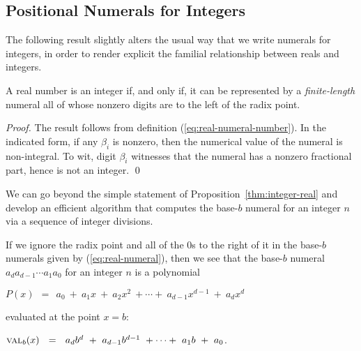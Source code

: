 \subsection{Positional Numerals for Integers}
\label{sec:special-numerals-N}


The following result slightly alters the usual way that we write numerals for integers, in order to render explicit the familial relationship between reals and integers.


\begin{prop}
\label{thm:integer-real}
A real number is an integer if, and only if, it can be represented by a {\em finite-length} numeral all of whose nonzero digits are to the left of the radix point.
\end{prop}

\begin{proof}
The result follows from definition (\ref{eq:real-numeral-number}).  In the indicated form, if any $\beta_i$ is nonzero, then the numerical value of the numeral is non-integral.  To wit, digit $\beta_i$ witnesses that the numeral has a nonzero fractional part, hence is not an integer.  \qed
\end{proof}

\medskip

We can go beyond the simple statement of Proposition~\ref{thm:integer-real} and develop an efficient algorithm that computes the base-$b$ numeral for an integer $n$ via a sequence of integer divisions.

\bigskip

If we ignore the radix point and all of the $0$s to the right of it in the base-$b$ numerals given by (\ref{eq:real-numeral}), then we see that the base-$b$ numeral $a_d a_{d-1} \cdots a_1 a_0$ for an integer $n$ is a polynomial

\smallskip

$P(x) \ \ = \ \ a_0 \ + \ a_1 x \ + \ a_2 x^2 \ + \cdots + \ a_{d-1} x^{d-1} \ + \ a_d x^d$

\smallskip

\noindent
evaluated at the point $x=b$:

\smallskip

$\mbox{\sc val}_{b}(x) \ \ = \ \ a_d b^d \ + \ a_{d-1} b^{d-1} \ + \cdots + \ a_1 b \ + \ a_0$.

